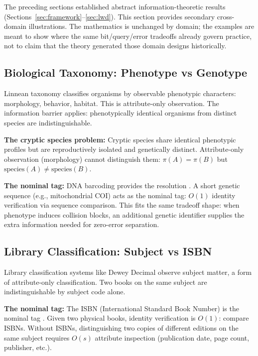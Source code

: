 The preceding sections established abstract information-theoretic results (Sections~\ref{sec:framework}--\ref{sec:lwd}). This section provides secondary cross-domain illustrations. The mathematics is unchanged by domain; the examples are meant to show where the same bit/query/error tradeoffs already govern practice, not to claim that the theory generated those domain designs historically.

\subsection{Biological Taxonomy: Phenotype vs Genotype}

Linnean taxonomy classifies organisms by observable phenotypic characters: morphology, behavior, habitat. This is attribute-only observation. The information barrier applies: phenotypically identical organisms from distinct species are indistinguishable.

\textbf{The cryptic species problem:} Cryptic species share identical phenotypic profiles but are reproductively isolated and genetically distinct. Attribute-only observation (morphology) cannot distinguish them: $\pi(A) = \pi(B)$ but $\text{species}(A) \neq \text{species}(B)$.

\textbf{The nominal tag:} DNA barcoding provides the resolution \cite{DNABarcoding}. A short genetic sequence (e.g., mitochondrial COI) acts as the nominal tag: $O(1)$ identity verification via sequence comparison. This fits the same tradeoff shape: when phenotype induces collision blocks, an additional genetic identifier supplies the extra information needed for zero-error separation.

\subsection{Library Classification: Subject vs ISBN}

Library classification systems like Dewey Decimal observe subject matter, a form of attribute-only classification. Two books on the same subject are indistinguishable by subject code alone.

\textbf{The nominal tag:} The ISBN (International Standard Book Number) is the nominal tag \cite{ISBN}. Given two physical books, identity verification is $O(1)$: compare ISBNs. Without ISBNs, distinguishing two copies of different editions on the same subject requires $O(s)$ attribute inspection (publication date, page count, publisher, etc.).

